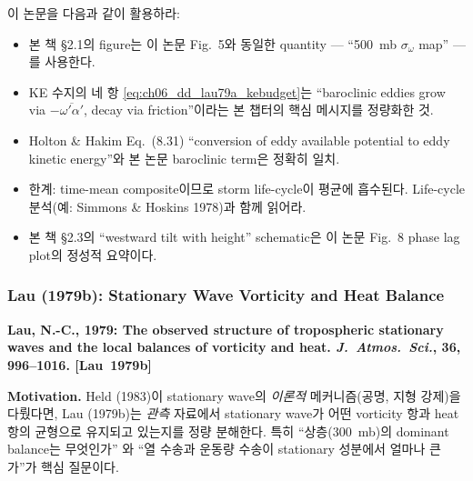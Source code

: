 \begin{hisublock}
이 논문을 다음과 같이 활용하라:
\begin{itemize}
  \item 본 책 \S2.1의 figure는 이 논문 Fig.~5와 동일한 quantity ---
        ``500~mb $\sigma_\omega$ map'' --- 를 사용한다.
  \item KE 수지의 네 항 \eqref{eq:ch06_dd_lau79a_kebudget}는 ``baroclinic eddies
        grow via $-\overline{\omega'\alpha'}$, decay via friction''이라는
        본 챕터의 핵심 메시지를 정량화한 것.
  \item Holton \& Hakim Eq.~(8.31) ``conversion of eddy available potential
        to eddy kinetic energy''와 본 논문 baroclinic term은 정확히 일치.
  \item 한계: time-mean composite이므로 storm life-cycle이 평균에 흡수된다.
        Life-cycle 분석(예: Simmons \& Hoskins 1978)과 함께 읽어라.
  \item 본 책 \S2.3의 ``westward tilt with height'' schematic은
        이 논문 Fig.~8 phase lag plot의 정성적 요약이다.
\end{itemize}
\end{hisublock}


\subsubsection{Lau (1979b): Stationary Wave Vorticity and Heat Balance}

\textbf{Lau, N.-C., 1979: The observed structure of tropospheric stationary waves and the local balances of vorticity and heat.
\emph{J.\ Atmos.\ Sci.}, \textbf{36}, 996--1016.  [Lau~1979b]}

\medskip
\noindent\textbf{Motivation.}\quad
Held (1983)이 stationary wave의 \emph{이론적} 메커니즘(공명, 지형 강제)을 다뤘다면,
Lau (1979b)는 \emph{관측} 자료에서 stationary wave가 어떤 vorticity 항과 heat 항의 균형으로
유지되고 있는지를 정량 분해한다.  특히 ``상층(300~mb)의 dominant balance는 무엇인가''
와 ``열 수송과 운동량 수송이 stationary 성분에서 얼마나 큰가''가 핵심 질문이다.

